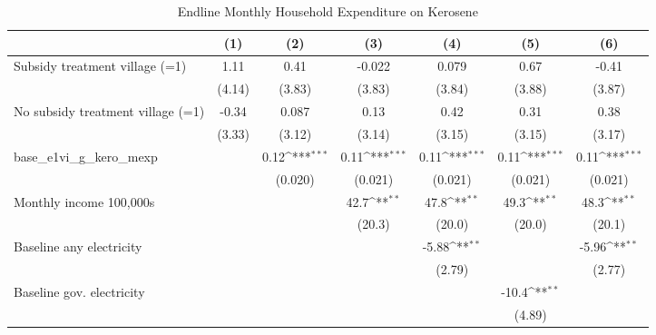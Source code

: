 \begin{table}[htbp]\centering
\def\sym#1{\ifmmode^{#1}\else\(^{#1}\)\fi}
\caption{Endline Monthly Household Expenditure on Kerosene}
\begin{tabular*}{1\hsize}{@{\hskip\tabcolsep\extracolsep\fill}l*{6}{c}}
\toprule
                &\multicolumn{1}{c}{(1)}         &\multicolumn{1}{c}{(2)}         &\multicolumn{1}{c}{(3)}         &\multicolumn{1}{c}{(4)}         &\multicolumn{1}{c}{(5)}         &\multicolumn{1}{c}{(6)}         \\
\midrule
Subsidy treatment village (=1)&     1.11         &     0.41         &   -0.022         &    0.079         &     0.67         &    -0.41         \\
                &   (4.14)         &   (3.83)         &   (3.83)         &   (3.84)         &   (3.88)         &   (3.87)         \\
No subsidy treatment village (=1)&    -0.34         &    0.087         &     0.13         &     0.42         &     0.31         &     0.38         \\
                &   (3.33)         &   (3.12)         &   (3.14)         &   (3.15)         &   (3.15)         &   (3.17)         \\
base\_e1vi\_g\_kero\_mexp&                  &     0.12\sym{***}&     0.11\sym{***}&     0.11\sym{***}&     0.11\sym{***}&     0.11\sym{***}\\
                &                  &  (0.020)         &  (0.021)         &  (0.021)         &  (0.021)         &  (0.021)         \\
Monthly income 100,000s&                  &                  &     42.7\sym{**} &     47.8\sym{**} &     49.3\sym{**} &     48.3\sym{**} \\
                &                  &                  &   (20.3)         &   (20.0)         &   (20.0)         &   (20.1)         \\
Baseline any electricity&                  &                  &                  &    -5.88\sym{**} &                  &    -5.96\sym{**} \\
                &                  &                  &                  &   (2.79)         &                  &   (2.77)         \\
Baseline gov. electricity&                  &                  &                  &                  &    -10.4\sym{**} &                  \\
                &                  &                  &                  &                  &   (4.89)         &                  \\

\end{tabular*}
\end{table}
